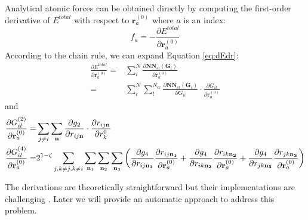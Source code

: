 \documentclass[preprint]{revtex4-2}
\begin{document}
Analytical atomic forces can be obtained directly by computing the first-order 
derivative of $E^{total}$ with respect to $\mathbf{r}_{a}^{(0)}$ where $a$ is an 
index:
\begin{equation}
\label{eq:dEdr}
f_a = -\frac{\partial E^{total}}{\partial \mathbf{r}_a^{(0)}}
\end{equation}
According to the chain rule, we can expand Equation \ref{eq:dEdr}:
\begin{align}
\frac{\partial E^{total}}{\partial \mathbf{r}_a^{(0)}} = & \sum_{i}^{N}{
    \frac{
        \partial\mathbf{NN}_{el}(\mathbf{G}_i)}{
        \partial \mathbf{r}_a^{(0)}}} \nonumber \\
= & \sum_{i}^{N}{\sum_{l}^{N_G}{
    \frac{\partial \mathbf{NN}_{el}(\mathbf{G}_i)}{\partial G_{il}}
    \cdot
    \frac{\partial G_{il}}{\partial \mathbf{r}_{a}^{(0)}}
}}
\end{align}
and 
\begin{align}
\frac{\partial G_{il}^{(2)}}{\partial \mathbf{r}_{a}^{(0)}} = & \sum_{j \neq i}{
    \sum_{\mathbf{n}}{
        \frac{\partial g_2}{\partial r_{ij\mathbf{n}}}
        \cdot
        \frac{\partial r_{ij\mathbf{n}}}{\partial r_k^{0}}
    }
} \\
\frac{\partial G_{il}^{(4)}}{\partial \mathbf{r}_{a}^{(0)}} = &
2^{1 - \zeta}\sum_{j, k \neq j, k \neq i}{
    \sum_{\mathbf{n}_1}{\sum_{\mathbf{n}_2}{\sum_{\mathbf{n}_3}{
        \left(
            \frac{\partial g_4}{\partial r_{ij\mathbf{n_1}}}
            \frac{\partial r_{ij\mathbf{n_1}}}{\partial \mathbf{r}_{a}^{(0)}} + 
            \frac{\partial g_4}{\partial r_{ik\mathbf{n_2}}}
            \frac{\partial r_{ik\mathbf{n_2}}}{\partial \mathbf{r}_{a}^{(0)}} + 
            \frac{\partial g_4}{\partial r_{jk\mathbf{n_3}}}
            \frac{\partial r_{jk\mathbf{n_3}}}{\partial \mathbf{r}_{a}^{(0)}}
        \right)
    }}}
}
\end{align}

The derivations are theoretically straightforward but their implementations are 
challenging \cite{AMP}. Later we will provide an automatic approach to address 
this problem.
\end{document}
